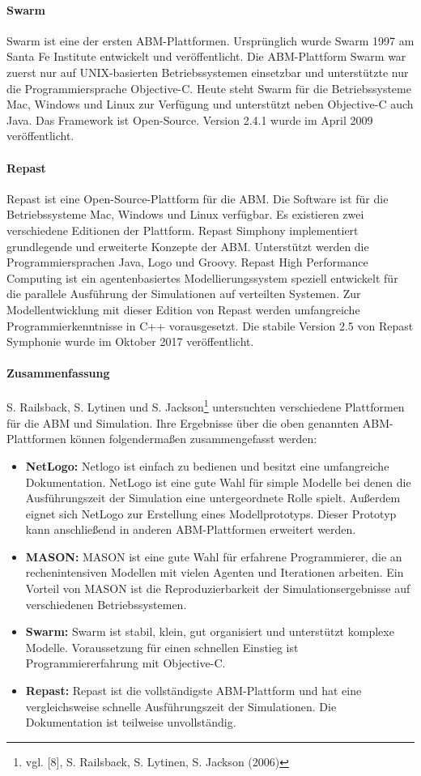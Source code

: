 \documentclass[a4paper, 11pt]{article}
\begin{document}
\paragraph{Swarm}
Swarm ist eine der ersten \acs{ABM}-Plattformen. Ursprünglich wurde Swarm 1997 am Santa Fe Institute entwickelt und veröffentlicht. Die ABM-Plattform Swarm war zuerst nur auf UNIX-basierten Betriebssystemen einsetzbar und unterstützte nur die Programmiersprache Objective-C. Heute steht Swarm für die Betriebssysteme Mac, Windows und Linux zur Verfügung und unterstützt neben Objective-C auch Java. Das Framework ist Open-Source. Version 2.4.1 wurde im April 2009 veröffentlicht.
\paragraph{Repast}
Repast ist eine Open-Source-Plattform für die \acs{ABM}. Die Software ist für die Betriebssysteme Mac, Windows und Linux verfügbar. Es existieren zwei verschiedene Editionen der Plattform. Repast Simphony implementiert grundlegende und erweiterte Konzepte der \acs{ABM}. Unterstützt werden die Programmiersprachen Java, Logo und Groovy. Repast High Performance Computing ist ein agentenbasiertes Modellierungssystem speziell entwickelt für die parallele Ausführung der Simulationen auf verteilten Systemen. Zur Modellentwicklung mit dieser Edition von Repast werden umfangreiche Programmierkenntnisse in C++ vorausgesetzt. Die stabile Version 2.5 von Repast Symphonie wurde im Oktober 2017 veröffentlicht. 
\paragraph{Zusammenfassung}
S. Railsback, S. Lytinen und S. Jackson\footnote{vgl. [8], S. Railsback, S. Lytinen, S. Jackson (2006)} untersuchten verschiedene Plattformen für die \acs{ABM} und Simulation. Ihre Ergebnisse über die oben genannten \acs{ABM}-Plattformen können folgendermaßen zusammengefasst werden:
\begin{itemize}
	\item \textbf{NetLogo:} Netlogo ist einfach zu bedienen und besitzt eine umfangreiche Dokumentation. NetLogo ist eine gute Wahl für simple Modelle bei denen die Ausführungszeit der Simulation eine untergeordnete Rolle spielt. Außerdem eignet sich NetLogo zur Erstellung eines Modellprototyps. Dieser Prototyp kann anschließend in anderen \acs{ABM}-Plattformen erweitert werden.
	\item \textbf{MASON:} MASON ist eine gute Wahl für erfahrene Programmierer, die an rechenintensiven Modellen mit vielen Agenten und Iterationen arbeiten. Ein Vorteil von MASON ist die Reproduzierbarkeit der Simulationsergebnisse auf verschiedenen Betriebssystemen.
	\item \textbf{Swarm:} Swarm ist stabil, klein, gut organisiert und unterstützt komplexe Modelle. Voraussetzung für einen schnellen Einstieg ist Programmiererfahrung mit Objective-C.
	\item \textbf{Repast:} Repast ist die vollständigste \acs{ABM}-Plattform und hat eine vergleichsweise schnelle Ausführungszeit der Simulationen. Die Dokumentation ist teilweise unvollständig.
\end{itemize}
\end{document}
